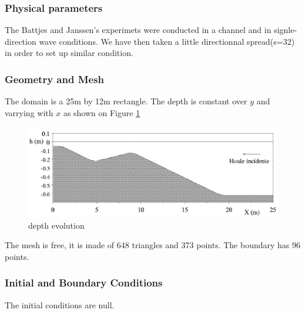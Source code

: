 %    
%
%

%
%
\subsubsection{Physical parameters}
%
The Battjes and Janssen's experimets were conducted in a channel and in signle-direction wave conditions. We have then taken a little directionnal spread(s=32) in order to set up similar condition. 

%
%
\subsubsection{Geometry and Mesh}
%
The domain is a 25m by 12m rectangle. The depth is constant over $y$ and varrying with $x$ as shown on Figure \ref{bathybj}

\begin{figure} [!h]
\centering
\includegraphics[scale = 0.8]{bathy.png}
 \caption{depth evolution}
\label{bathybj}
\end{figure}

The mesh is free, it is made of 648 triangles and 373 points. The boundary has 96 points. 
%
%
\subsubsection{Initial and Boundary Conditions}
The initial conditions are null. 

